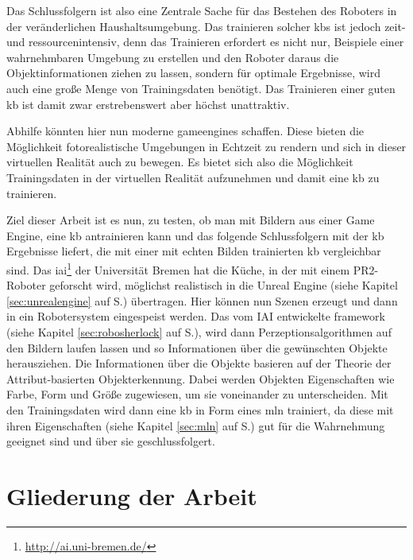 Das Schlussfolgern ist also eine Zentrale Sache für das Bestehen des Roboters in der veränderlichen Haushaltsumgebung. Das trainieren solcher \glspl{kb} ist jedoch zeit- und ressourcenintensiv, denn das Trainieren erfordert es nicht nur, Beispiele einer wahrnehmbaren Umgebung zu erstellen und den Roboter daraus die Objektinformationen ziehen zu lassen, sondern für optimale Ergebnisse, wird auch eine große Menge von Trainingsdaten benötigt. Das Trainieren  einer guten \gls{kb} ist damit zwar erstrebenswert aber höchst unattraktiv. \par      
Abhilfe könnten hier nun moderne \glspl{gameengine} schaffen. Diese bieten die Möglichkeit fotorealistische Umgebungen in Echtzeit zu rendern und sich in dieser virtuellen Realität auch zu bewegen. Es bietet sich also die Möglichkeit Trainingsdaten in der virtuellen Realität aufzunehmen und damit eine \gls{kb} zu trainieren. \par  
Ziel dieser Arbeit ist es nun, zu testen, ob man mit Bildern aus einer Game Engine, eine \gls{kb} antrainieren kann und das folgende Schlussfolgern mit der \gls{kb} Ergebnisse liefert, die mit einer mit echten Bilden trainierten \gls{kb} vergleichbar sind. Das \gls{iai}\footnote{\url{http://ai.uni-bremen.de/}} der Universität Bremen hat die Küche, in der mit einem PR2-Roboter geforscht wird, möglichst realistisch in die Unreal Engine (siehe Kapitel \ref{sec:unrealengine} auf S.\pageref{sec:unrealengine}) übertragen. Hier können nun Szenen erzeugt und dann in ein Robotersystem eingespeist werden. Das vom IAI entwickelte \gls{framework} \robosherlock (siehe Kapitel \ref{sec:robosherlock} auf S.\pageref{sec:robosherlock}), wird dann Perzeptionsalgorithmen auf den Bildern laufen lassen und so Informationen über die gewünschten Objekte herausziehen. Die Informationen über die Objekte basieren auf der Theorie der Attribut-basierten Objekterkennung. Dabei werden Objekten Eigenschaften wie Farbe, Form und Größe zugewiesen, um sie voneinander zu unterscheiden.  Mit den Trainingsdaten wird dann eine \gls{kb} in Form eines \gls{mln}  trainiert, da diese mit ihren Eigenschaften (siehe Kapitel \ref{sec:mln} auf S.\pageref{sec:mln}) gut für die Wahrnehmung geeignet sind und über sie geschlussfolgert.  


\section{Gliederung der Arbeit}
\label{sec:gliederung}

